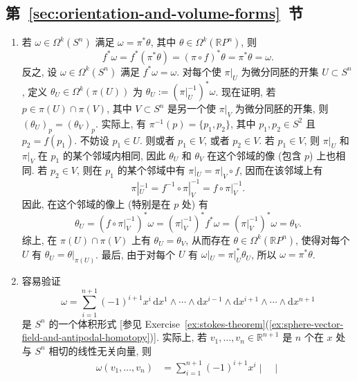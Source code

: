 \subsection{\texorpdfstring{第~\ref{sec:orientation-and-volume-forms}~节}{定向与体积形式}}\label{subsec:solutions-orientation-and-volume-forms}

\begin{description}[font=\normalfont,leftmargin=2em,labelwidth=1.5em]
\begin{enumerate}[label=(\alph*),ref=\alph*,leftmargin=*]
\item 若 $\omega\in\Omega^k(S^n)$ 满足 $\omega=\pi^*\theta$, 其中 $\theta\in\Omega^k(\mathbb{R}P^n)$, 则
\[
  f^*\omega=f^*(\pi^*\theta)=(\pi\circ f)^*\theta=\pi^*\theta=\omega.
\]
反之, 设 $\omega\in\Omega^k(S^n)$ 满足 $f^*\omega=\omega$. 对每个使 $\pi|_U$ 为微分同胚的开集 $U\subset S^n$, 定义 $\theta_U\in\Omega^k(\pi(U))$ 为 $\theta_U:=(\pi|_U^{-1})^*\omega$. 现在证明, 若 $p\in\pi(U)\cap\pi(V)$, 其中 $V\subset S^n$ 是另一个使 $\pi|_V$ 为微分同胚的开集, 则 $(\theta_U)_p=(\theta_V)_p$. 实际上, 有 $\pi^{-1}(p)=\{p_1,p_2\}$, 其中 $p_1,p_2\in S^2$ 且 $p_2=f(p_1)$. 不妨设 $p_1\in U$. 则或者 $p_1\in V$, 或者 $p_2\in V$. 若 $p_1\in V$, 则 $\pi|_U$ 和 $\pi|_V$ 在 $p_1$ 的某个邻域内相同, 因此 $\theta_U$ 和 $\theta_V$ 在这个邻域的像 (包含 $p$) 上也相同. 若 $p_2\in V$, 则在 $p_1$ 的某个邻域中有 $\pi|_U=\pi|_V\circ f$, 因而在该邻域上有
\[
  \pi|_U^{-1}=f^{-1}\circ\pi|_V^{-1}=f\circ\pi|_V^{-1}.
\]
因此, 在这个邻域的像上 (特别是在 $p$ 处) 有
\[
  \theta_U=(f\circ\pi|_V^{-1})^*\omega=(\pi|_V^{-1})^* f^*\omega
  =(\pi|_V^{-1})^*\omega=\theta_V.
\]
综上, 在 $\pi(U)\cap\pi(V)$ 上有 $\theta_U=\theta_V$, 从而存在 $\theta\in\Omega^k(\mathbb{R}P^n)$, 使得对每个 $U$ 有 $\theta_U=\theta|_{\pi(U)}$. 最后, 由于对每个 $U$ 有 $\omega|_U=\pi|_U^*\theta_U$, 所以 $\omega=\pi^*\theta$.
\item\label{sol:sphere-volume-form-and-projective-orientability} 容易验证
\[
  \omega=\sum_{i=1}^{n+1}(-1)^{i+1}x^i\,\mathrm{d}x^1\wedge\cdots\wedge
  \mathrm{d}x^{i-1}\wedge\mathrm{d}x^{i+1}\wedge\cdots\wedge\mathrm{d}x^{n+1}
\]
是 $S^n$ 的一个体积形式 [参见 Exercise~\ref{ex:stokes-theorem}(\ref{ex:sphere-vector-field-and-antipodal-homotopy})]. 实际上, 若 $v_1,\ldots,v_n\in\mathbb{R}^{n+1}$ 是 $n$ 个在 $x$ 处与 $S^n$ 相切的线性无关向量, 则
\begin{align*}
  \omega(v_1,\ldots,v_n)
  &=\sum_{i=1}^{n+1}(-1)^{i+1}x^i
  \begin{vmatrix}

\end{vmatrix}
\end{align*}
\end{enumerate}
\end{description}
